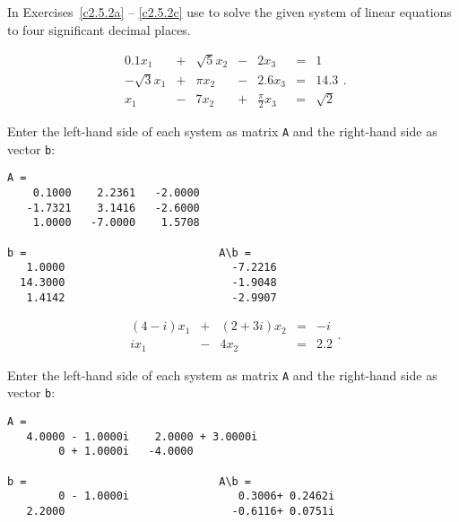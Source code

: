 \documentclass{ximera}
\begin{document}
\CEXER

\noindent In Exercises~\ref{c2.5.2a} -- \ref{c2.5.2c} use \Matlab to
solve the given system of linear equations to four significant decimal places.
\begin{exercise} \label{c2.5.2a}
\[
\begin{array}{rcrcrcr}
     0.1 x_1 & + & \sqrt{5}x_2 & - &   2 x_3 & = & 1 \\
-\sqrt{3}x_1 & + &     \pi x_2 & - & 2.6 x_3 & = & 14.3 \\
         x_1 & - &       7 x_2 & + & \frac{\pi}{2}x_3 & = & \sqrt{2}
\end{array}.
\]

\begin{solution}

Enter the left-hand side of each system as matrix {\tt A} 
and the right-hand side as vector {\tt b}:

\begin{verbatim}
A =                           
    0.1000    2.2361   -2.0000
   -1.7321    3.1416   -2.6000
    1.0000   -7.0000    1.5708

b =                              A\b =
   1.0000                          -7.2216
  14.3000                          -1.9048
   1.4142                          -2.9907
\end{verbatim}

\end{solution}
\end{exercise}
\begin{exercise} \label{c2.5.2b}
\[
\begin{array}{rcrcr}
(4-i)x_1 & + & (2+3i)x_2 & = &  -i \\
   i x_1 & - &     4 x_2 & = & 2.2
\end{array}.
\]

\begin{solution}

Enter the left-hand side of each system as matrix {\tt A} 
and the right-hand side as vector {\tt b}:

\begin{verbatim}
A =
   4.0000 - 1.0000i    2.0000 + 3.0000i
        0 + 1.0000i   -4.0000          

b =                              A\b =
        0 - 1.0000i                 0.3006+ 0.2462i
   2.2000                          -0.6116+ 0.0751i
\end{verbatim}

\end{solution}
\end{exercise}
\end{document}
